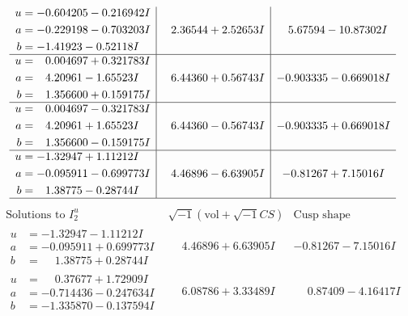 \documentclass[1p]{elsarticle_modified}
\theoremstyle{definition}
\newcommand{\I}{\sqrt{-1}}
\begin{document}
$$\begin{array}{c|c|c}
\begin{aligned}
u &= -0.604205 - 0.216942 I \\
a &= -0.229198 - 0.703203 I \\
b &= -1.41923 - 0.52118 I\end{aligned}
 & \phantom{-}2.36544 + 2.52653 I & \phantom{-}5.67594 - 10.87302 I \\ \hline\begin{aligned}
u &= \phantom{-}0.004697 + 0.321783 I \\
a &= \phantom{-}4.20961 - 1.65523 I \\
b &= \phantom{-}1.356600 + 0.159175 I\end{aligned}
 & \phantom{-}6.44360 + 0.56743 I & -0.903335 - 0.669018 I \\ \hline\begin{aligned}
u &= \phantom{-}0.004697 - 0.321783 I \\
a &= \phantom{-}4.20961 + 1.65523 I \\
b &= \phantom{-}1.356600 - 0.159175 I\end{aligned}
 & \phantom{-}6.44360 - 0.56743 I & -0.903335 + 0.669018 I \\ \hline\begin{aligned}
u &= -1.32947 + 1.11212 I \\
a &= -0.095911 - 0.699773 I \\
b &= \phantom{-}1.38775 - 0.28744 I\end{aligned}
 & \phantom{-}4.46896 - 6.63905 I & -0.81267 + 7.15016 I\\
 \hline 
 \end{array}$$\newpage$$\begin{array}{c|c|c}  
\text{Solutions to }I^u_{2}& \I (\text{vol} + \sqrt{-1}CS) & \text{Cusp shape}\\
 \hline 
\begin{aligned}
u &= -1.32947 - 1.11212 I \\
a &= -0.095911 + 0.699773 I \\
b &= \phantom{-}1.38775 + 0.28744 I\end{aligned}
 & \phantom{-}4.46896 + 6.63905 I & -0.81267 - 7.15016 I \\ \hline\begin{aligned}
u &= \phantom{-}0.37677 + 1.72909 I \\
a &= -0.714436 - 0.247634 I \\
b &= -1.335870 - 0.137594 I\end{aligned}
 & \phantom{-}6.08786 + 3.33489 I & \phantom{-}0.87409 - 4.16417 I \\ \hline\begin{aligned}

\end{aligned}
\end{array}$$
\end{document}
